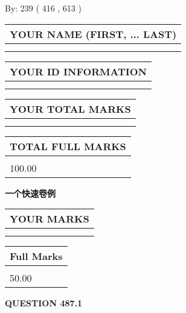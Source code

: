 \documentclass{ctexart}
\begin{document}
   
\hspace{1.0in} By: 
 239 ( 416 ,  613 )
   
   
   
   
\newpage 
\setcounter{page}{ 
   487001 } 
   
   
   
   
\noindent\begin{tabular}{|l|}
\hline
YOUR NAME (FIRST, ... LAST)  \\
\hline
 \\ 
 \\ 
\hline
\end{tabular}
\hspace{0.05in} \begin{tabular}{|l|}
\hline
 YOUR   ID   INFORMATION  \\
\hline
 \\ 
 \\ 
\hline
\end{tabular}
   
   
\vspace{0.2in}\noindent\begin{tabular}{|l|}
\hline
YOUR TOTAL MARKS  \\
\hline
 \\ 
 \\ 
\hline
\end{tabular}
\hspace{0.05in} \begin{tabular}{|l|}
\hline
TOTAL FULL MARKS  \\
\hline
 \\ 
100.00 \\
\hline
\end{tabular}
   
   
 \vspace{0.2in}
{\LARGE {\textbf{ 一个快速卷例}}}
   
   
  
\vspace{0.2in}
  
\noindent\begin{tabular}{|l|}
\hline
 YOUR MARKS  \\
\hline
 \\ 
 \\ 
\hline
\end{tabular}
\hspace{0.05in} \begin{tabular}{|l|}
\hline
 Full Marks  \\
\hline
 \\ 
50.00 \\
\hline
\end{tabular}
{\textbf{\Large{QUESTION
487.1 
}}}
  
\end{document}

